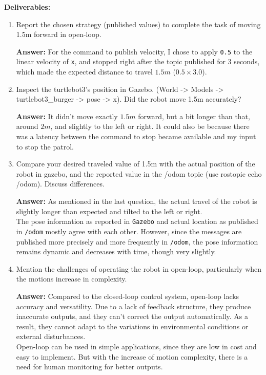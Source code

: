 \documentclass[12pt]{article}
\begin{document}
\textbf{Deliverables:}
\begin{enumerate}

    \item Report the chosen strategy (published values) to complete the task of moving 1.5m forward in open-loop.
    
    \textbf{Answer: }For the command to publish velocity, I chose to apply \texttt{0.5} to the linear velocity of \texttt{x}, and stopped right after the topic published for $3$ seconds, which made the expected distance to travel $1.5m$ ($0.5 \times 3.0$).
    
    \item Inspect the turtlebot3’s position in Gazebo. (World -> Models -> turtlebot3\_burger -> pose -> x). Did the robot move 1.5m accurately?
    
    \textbf{Answer: }It didn't move exactly $1.5m$ forward, but a bit longer than that, around $2m$, and slightly to the left or right. It could also be because there was a latency between the command to stop became available and my input to stop the patrol.
    
    \item Compare your desired traveled value of 1.5m with the actual position of the robot in gazebo, and the reported value in the /odom topic (use rostopic echo /odom). Discuss differences.
    
    \textbf{Answer: }As mentioned in the last question, the actual travel of the robot is slightly longer than expected and tilted to the left or right.
    \\The pose information as reported in \texttt{Gazebo} and actual location as published in \texttt{/odom} mostly agree with each other. However, since the messages are published more precisely and more frequently in \texttt{/odom}, the pose information remains dynamic and decreases with time, though very slightly.
  
    \item Mention the challenges of operating the robot in open-loop, particularly when the motions increase in complexity.
    
    \textbf{Answer: }Compared to the closed-loop control system, open-loop lacks accuracy and versatility. Due to a lack of feedback structure, they produce inaccurate outputs, and they can't correct the output automatically. As a result, they cannot adapt to the variations in environmental conditions or external disturbances.
    \\Open-loop can be used in simple applications, since they are low in cost and easy to implement. But with the increase of motion complexity, there is a need for human monitoring for better outputs.


\end{enumerate}
\end{document}
